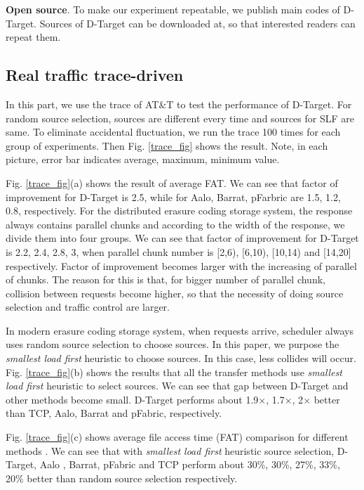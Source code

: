 \documentclass{IEEEtran}
\begin{document}
\textbf{Open source}.
To make our experiment repeatable, we publish main codes of D-Target. 
Sources of D-Target can be downloaded at\cite{DTARGET}, so that interested readers can repeat them.


\subsection{Real traffic trace-driven}
In this part, we use the trace of AT$\&$T to test the performance of D-Target. 
For random source selection, sources are different every time and sources for SLF are same.
To eliminate accidental fluctuation,
we run the trace 100 times for each group of experiments. 
Then Fig. \ref{trace_fig} shows the result.
Note, in each picture, error bar indicates average, maximum, minimum value.

Fig. \ref{trace_fig}(a) shows the result of average FAT.
We can see that factor of improvement for D-Target is 2.5,
while for Aalo, Barrat, pFarbric are 1.5, 1.2, 0.8, respectively.
For the distributed erasure coding storage system,  the response always contains parallel chunks and according to the width of the response, we divide them into four groups.
We can see that factor of improvement for D-Target is 2.2, 2.4, 2.8, 3, 
when parallel chunk number is [2,6), [6,10), [10,14) and [14,20] respectively.
Factor of improvement becomes larger with the increasing of parallel of chunks.
The reason for this is that, for bigger number of parallel chunk,
collision between requests become higher,
so that the necessity of doing source selection and traffic control are larger.

In modern erasure coding storage system, when requests arrive, 
scheduler always uses random source selection to choose sources.
In this paper, we purpose the {\em smallest load  first} heuristic to choose sources.
In this case, less collides will occur.
Fig. \ref{trace_fig}(b) shows the results that all the transfer methods use {\em smallest load  first} heuristic to select sources.
We can see that gap between D-Target and other methods become small.
D-Target performs about 1.9$\times$, 1.7$\times$, 2$\times$ better than TCP,  Aalo, Barrat and pFabric, respectively.


Fig. \ref{trace_fig}(c) shows average file access time (FAT) comparison for different methods .
We can see that  with  {\em smallest load  first} heuristic source selection, D-Target,  Aalo \cite{chowdhury2015efficient}, Barrat\cite{dogar2014decentralized}, pFabric\cite{pFabric} and TCP
 perform about 30\%, 30\%, 27\%, 33\%, 20\% better than random source selection respectively.
 
\end{document}
